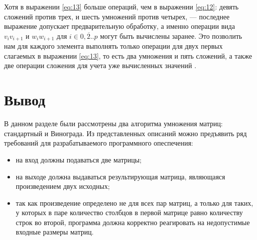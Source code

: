 Хотя в выражении \ref{eq:13} больше операций, чем в выражении \ref{eq:12}:
девять сложений против трех, и шесть умножений против четырех, --- последнее
выражение допускает предварительную обработку, а именно операции вида
$v_iv_{i+1}$ и $w_iw_{i+1}$ для $i \in \overline{0,2..p}$ могут быть вычислены
заранее. Это позволить нам для каждого элемента выполнять только операции для
двух первых слагаемых в выражении \ref{eq:13}, то есть два умножения и пять
сложений, а также две операции сложения для учета уже вычисленных значений
\cite{winograd} .

\section{Вывод}

В данном разделе были рассмотрены два алгоритма умножения матриц: стандартный
и Винограда. Из представленных описаний можно предъявить ряд требований для
разрабатываемого программного опеспечения:
\begin{itemize}[left=\parindent]
    \item на вход должны подаваться две матрицы;
    \item на выходе должна выдаваться результирующая матрица, являющаяся
          произведением двух исходных;
    \item так как произведение определено не для всех пар матриц, а только для
          таких, у которых в паре количество столбцов в первой матрице равно
          количеству строк во второй, программа должна корректно реагировать на
          недопустимые входные размеры матриц.
\end{itemize}
